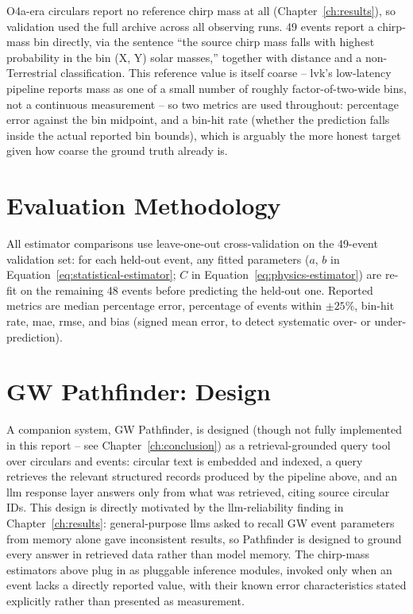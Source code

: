 O4a-era circulars report no reference chirp mass at all (Chapter~\ref{ch:results}), so validation used the full archive across all observing runs. 49 events report a chirp-mass bin directly, via the sentence ``the source chirp mass falls with highest probability in the bin (X, Y) solar masses,'' together with distance and a non-Terrestrial classification. This reference value is itself coarse -- \gls{lvk}'s low-latency pipeline reports mass as one of a small number of roughly factor-of-two-wide bins, not a continuous measurement -- so two metrics are used throughout: percentage error against the bin midpoint, and a bin-hit rate (whether the prediction falls inside the actual reported bin bounds), which is arguably the more honest target given how coarse the ground truth already is.

\section{Evaluation Methodology}

All estimator comparisons use leave-one-out cross-validation on the 49-event validation set: for each held-out event, any fitted parameters ($a$, $b$ in Equation~\ref{eq:statistical-estimator}; $C$ in Equation~\ref{eq:physics-estimator}) are re-fit on the remaining 48 events before predicting the held-out one. Reported metrics are median percentage error, percentage of events within $\pm25\%$, bin-hit rate, \gls{mae}, \gls{rmse}, and bias (signed mean error, to detect systematic over- or under-prediction).

\section{GW Pathfinder: Design}

A companion system, GW Pathfinder, is designed (though not fully implemented in this report -- see Chapter~\ref{ch:conclusion}) as a retrieval-grounded query tool over circulars and events: circular text is embedded and indexed, a query retrieves the relevant structured records produced by the pipeline above, and an \gls{llm} response layer answers only from what was retrieved, citing source circular IDs. This design is directly motivated by the \gls{llm}-reliability finding in Chapter~\ref{ch:results}: general-purpose \glspl{llm} asked to recall GW event parameters from memory alone gave inconsistent results, so Pathfinder is designed to ground every answer in retrieved data rather than model memory. The chirp-mass estimators above plug in as pluggable inference modules, invoked only when an event lacks a directly reported value, with their known error characteristics stated explicitly rather than presented as measurement.
